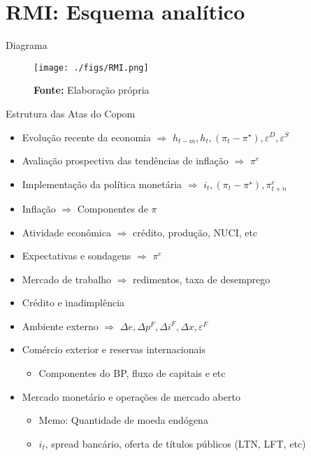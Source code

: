 \documentclass[presentation]{beamer}
\begin{document}
\section{RMI: Esquema analítico}
\label{sec:orgeb518e1}

\begin{frame}[label={sec:org772e10c}]{Diagrama}
\begin{figure}[htb]
\centering
\caption{Representação do Modelo do regime de Metas para inflação} 
\texttt{[image: ./figs/RMI.png]}
\label{fig:ibcbr}
\caption*{\textbf{Fonte:} Elaboração própria}
\end{figure}
\end{frame}
\begin{frame}[label={sec:org926d2d4}]{Estrutura das Atas do Copom}
\begin{itemize}
\item Evolução recente da economia \(\Rightarrow\) \(h_{t-m}, h_{t}, (\pi_{t} - \pi^{\star}), \varepsilon^{D}, \varepsilon^{S}\)
\item Avaliação prospectiva das tendências de inflação \(\Rightarrow\) \(\pi^{e}\)
\item Implementação da política monetária \(\Rightarrow\) \(i_{t}, (\pi_{t} - \pi^{\star}), \pi^{e}_{t+n}\)
\item Inflação \(\Rightarrow\) Componentes de \(\pi\)
\item Atividade econômica \(\Rightarrow\) crédito, produção, NUCI, etc
\item Expectativas e sondagens \(\Rightarrow\) \(\pi^{e}\)
\item Mercado de trabalho \(\Rightarrow\) redimentos, taxa de desemprego
\item Crédito e inadimplência
\item Ambiente externo \(\Rightarrow\) \(\Delta e, \Delta p^{F}, \Delta i^{F}, \Delta x, \varepsilon^{F}\)
\item Comércio exterior e reservas internacionais
\begin{itemize}
\item Componentes do BP, fluxo de capitais e etc
\end{itemize}
\item Mercado monetário e operações de mercado aberto
\begin{itemize}
\item \alert{Memo:} Quantidade de moeda endógena
\item \(i_{t}\), spread bancário, oferta de títulos públicos (LTN, LFT, etc)
\end{itemize}
\end{itemize}
\end{frame}
\end{document}
